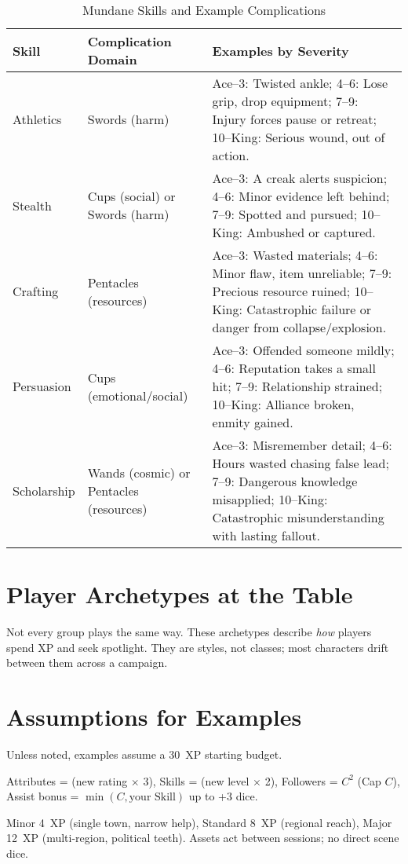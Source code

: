 \documentclass[12pt]{book}
\begin{document}
\begin{table}[h]
\centering
\begin{tabular}{|p{2cm}|p{3cm}|p{7cm}|}
\hline
\textbf{Skill} & \textbf{Complication Domain} & \textbf{Examples by Severity} \\
\hline
Athletics & Swords (harm) &  
Ace–3: Twisted ankle;  
4–6: Lose grip, drop equipment;  
7–9: Injury forces pause or retreat;  
10–King: Serious wound, out of action. \\
\hline
Stealth & Cups (social) or Swords (harm) &  
Ace–3: A creak alerts suspicion;  
4–6: Minor evidence left behind;  
7–9: Spotted and pursued;  
10–King: Ambushed or captured. \\
\hline
Crafting & Pentacles (resources) &  
Ace–3: Wasted materials;  
4–6: Minor flaw, item unreliable;  
7–9: Precious resource ruined;  
10–King: Catastrophic failure or danger from collapse/explosion. \\
\hline
Persuasion & Cups (emotional/social) &  
Ace–3: Offended someone mildly;  
4–6: Reputation takes a small hit;  
7–9: Relationship strained;  
10–King: Alliance broken, enmity gained. \\
\hline
Scholarship & Wands (cosmic) or Pentacles (resources) &  
Ace–3: Misremember detail;  
4–6: Hours wasted chasing false lead;  
7–9: Dangerous knowledge misapplied;  
10–King: Catastrophic misunderstanding with lasting fallout. \\
\hline
\end{tabular}
\caption{Mundane Skills and Example Complications}
\end{table}

\section{Player Archetypes at the Table}

Not every group plays the same way. These archetypes describe \emph{how} players spend XP and seek spotlight. They are styles, not classes; most characters drift between them across a campaign.

\section{Assumptions for Examples}
Unless noted, examples assume a 30~XP starting budget.
\begin{description}[leftmargin=2cm]
  \item[Costs:] Attributes = (new rating $\times$ 3), Skills = (new level $\times$ 2), Followers = $C^2$ (Cap $C$), Assist bonus = $\min(C,\text{your Skill})$ up to +3 dice.
  \item[Off-Screen Assets:] Minor 4~XP (single town, narrow help), Standard 8~XP (regional reach), Major 12~XP (multi-region, political teeth). Assets act between sessions; no direct scene dice.
\end{description}
\end{document}

